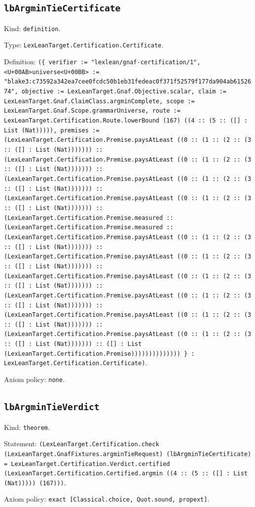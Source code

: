 \documentclass[11pt]{article}
\begin{document}
\subsection*{\texttt{lbArgminTieCertificate}}
\noindent Kind: \texttt{definition}.\par
\noindent Type: \texttt{LexLeanTarget.Certification.Certificate}.\par
\noindent Definition: \texttt{(\{ verifier := "lexlean/gnaf-certification/1", <U+00AB>universe<U+00BB> := "blake3:c73592a342ea7cee0fcdc50b1eb31fedeac0f371f52579f177da904ab6152674", objective := LexLeanTarget.Gnaf.Objective.scalar, claim := LexLeanTarget.Gnaf.ClaimClass.argminComplete, scope := LexLeanTarget.Gnaf.Scope.grammarUniverse, route := LexLeanTarget.Certification.Route.lowerBound (167) ((4 :: (5 :: ([] : List (Nat))))), premises := (LexLeanTarget.Certification.Premise.paysAtLeast ((0 :: (1 :: (2 :: (3 :: ([] : List (Nat))))))) :: (LexLeanTarget.Certification.Premise.paysAtLeast ((0 :: (1 :: (2 :: (3 :: ([] : List (Nat))))))) :: (LexLeanTarget.Certification.Premise.paysAtLeast ((0 :: (1 :: (2 :: (3 :: ([] : List (Nat))))))) :: (LexLeanTarget.Certification.Premise.paysAtLeast ((0 :: (1 :: (2 :: (3 :: ([] : List (Nat))))))) :: (LexLeanTarget.Certification.Premise.measured :: (LexLeanTarget.Certification.Premise.measured :: (LexLeanTarget.Certification.Premise.paysAtLeast ((0 :: (1 :: (2 :: (3 :: ([] : List (Nat))))))) :: (LexLeanTarget.Certification.Premise.paysAtLeast ((0 :: (1 :: (2 :: (3 :: ([] : List (Nat))))))) :: (LexLeanTarget.Certification.Premise.paysAtLeast ((0 :: (1 :: (2 :: (3 :: ([] : List (Nat))))))) :: (LexLeanTarget.Certification.Premise.paysAtLeast ((0 :: (1 :: (2 :: (3 :: ([] : List (Nat))))))) :: (LexLeanTarget.Certification.Premise.paysAtLeast ((0 :: (1 :: (2 :: (3 :: ([] : List (Nat))))))) :: (LexLeanTarget.Certification.Premise.paysAtLeast ((0 :: (1 :: (2 :: (3 :: ([] : List (Nat))))))) :: ([] : List (LexLeanTarget.Certification.Premise)))))))))))))) \} : LexLeanTarget.Certification.Certificate)}.\par
\noindent Axiom policy: \texttt{none}.\par
\subsection*{\texttt{lbArgminTieVerdict}}
\noindent Kind: \texttt{theorem}.\par
\noindent Statement: \texttt{(LexLeanTarget.Certification.check (LexLeanTarget.GnafFixtures.argminTieRequest) (lbArgminTieCertificate) = LexLeanTarget.Certification.Verdict.certified (LexLeanTarget.Certification.Certified.argmin ((4 :: (5 :: ([] : List (Nat))))) (167)))}.\par
\noindent Axiom policy: \texttt{exact [Classical.choice, Quot.sound, propext]}.\par
\end{document}
